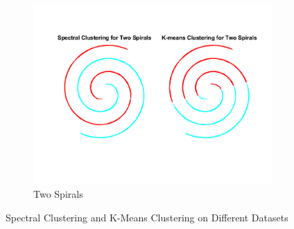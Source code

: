 \documentclass[unicode,11pt,a4paper,oneside,numbers=endperiod,openany]{scrartcl}
\begin{document}
\begin{figure}[H]
\begin{subfigure}{0.5\textwidth}
        \centering
        \includegraphics[width=\linewidth]{figures/1.7_Two Spirals.png}
        \caption{Two Spirals}
        \label{fig:two-spirals}
    \end{subfigure}
    \caption{Spectral Clustering and K-Means Clustering on Different Datasets}
    \label{fig:overall1}
\end{figure}
\end{document}
